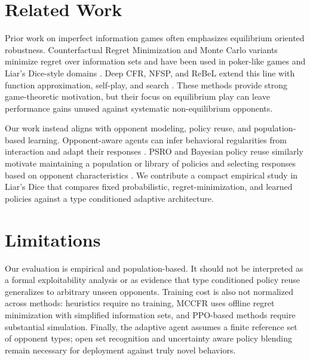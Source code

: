 \documentclass[letterpaper]{article} %
\begin{document}
\section{Related Work}
Prior work on imperfect information games often emphasizes equilibrium oriented robustness. Counterfactual Regret Minimization and Monte Carlo variants minimize regret over information sets and have been used in poker-like games and Liar's Dice-style domains \cite{cfr,mccfr}. Deep CFR, NFSP, and ReBeL extend this line with function approximation, self-play, and search \cite{brown2019deep,heinrich2016deep,kawamura2017neural,brown2020combining}. These methods provide strong game-theoretic motivation, but their focus on equilibrium play can leave performance gains unused against systematic non-equilibrium opponents.

Our work instead aligns with opponent modeling, policy reuse, and population-based learning. Opponent-aware agents can infer behavioral regularities from interaction and adapt their responses \cite{he2016opponent,yu2022model,jing2024opponent,yu2024opponent}. PSRO and Bayesian policy reuse similarly motivate maintaining a population or library of policies and selecting responses based on opponent characteristics \cite{lanctot2017unified,rosman2016bayesian}. We contribute a compact empirical study in Liar's Dice that compares fixed probabilistic, regret-minimization, and learned policies against a type conditioned adaptive architecture.


\section{Limitations}
Our evaluation is empirical and population-based. It should not be interpreted as a formal exploitability analysis or as evidence that type conditioned policy reuse generalizes to arbitrary unseen opponents. Training cost is also not normalized across methods: heuristics require no training, MCCFR uses offline regret minimization with simplified information sets, and PPO-based methods require substantial simulation. Finally, the adaptive agent assumes a finite reference set of opponent types; open set recognition and uncertainty aware policy blending remain necessary for deployment against truly novel behaviors.
\end{document}
